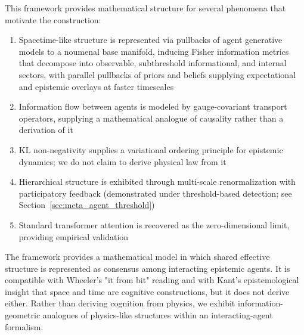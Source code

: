 \documentclass[11pt]{article}
\begin{document}
This framework provides mathematical structure for several phenomena that motivate the construction:
\begin{enumerate}
\item Spacetime-like structure is represented via pullbacks of agent generative models to a noumenal base manifold, inducing Fisher information metrics that decompose into observable, subthreshold informational, and internal sectors, with parallel pullbacks of priors and beliefs supplying expectational and epistemic overlays at faster timescales

\item Information flow between agents is modeled by gauge-covariant transport operators, supplying a mathematical analogue of causality rather than a derivation of it
\item KL non-negativity supplies a variational ordering principle for epistemic dynamics; we do not claim to derive physical law from it
\item Hierarchical structure is exhibited through multi-scale renormalization with participatory feedback (demonstrated under threshold-based detection; see Section~\ref{sec:meta_agent_threshold})
\item Standard transformer attention is recovered as the zero-dimensional limit, providing empirical validation
\end{enumerate}

The framework provides a mathematical model in which shared effective structure is represented as consensus among interacting epistemic agents. It is compatible with Wheeler's "it from bit" reading and with Kant's epistemological insight that space and time are cognitive constructions, but it does not derive either. Rather than deriving cognition from physics, we exhibit information-geometric analogues of physics-like structures within an interacting-agent formalism.
\end{document}
